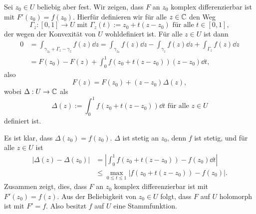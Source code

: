 \documentclass[a4paper,10pt]{article}
\begin{document}
Sei $z_0 \in U$ beliebig aber fest. Wir zeigen, dass $F$ an $z_0$ komplex differenzierbar ist mit $F'(z_0) = f(z_0)$. Hierfür definieren wir für alle $z \in \mathbb{C}$ den Weg
\[
 \Gamma_z : [0,1] \to U \text{ mit } \Gamma_z(t) := z_0 + t(z-z_0) \text{ für alle } t \in [0,1],
\]
der wegen der Konvexität von $U$ wohldefiniert ist. Für alle $z \in U$ ist dann
\begin{align*}
 0
 &= \int_{\gamma_{z_0} + \Gamma_z - \gamma_z} f(z) \dd{z}
 = \int_{\gamma_{z_0}} f(z) \dd{z} - \int_{\gamma_z} f(z) \dd{z} + \int_{\Gamma_z} f(z) \dd{z} \\
 &= F(z_0) - F(z) + \int_0^1 f(z_0 + t(z-z_0))(z-z_0) \dd{t},
\end{align*}
also
\[
 F(z) = F(z_0) + (z-z_0) \Delta(z),
\]
wobei $\Delta : U \to \mathbb{C}$ als
\[
 \Delta(z) := \int_0^1 f(z_0 + t(z-z_0)) \dd{t} \text{ für alle } z \in U
\]
definiert ist.

Es ist klar, dass $\Delta(z_0) = f(z_0)$. $\Delta$ ist stetig an $z_0$, denn $f$ ist stetig, und für alle $z \in U$ ist
\begin{align*}
 |\Delta(z)-\Delta(z_0)|
 &= \left| \int_0^1 f(z_0+t(z-z_0)) - f(z_0) \dd{t} \right| \\
 &\leq \max_{0 \leq t \leq 1} |f(z_0+t(z-z_0))-f(z_0)|.
\end{align*}
Zusammen zeigt, dies, dass $F$ an $z_0$ komplex differenzierbar ist mit $F'(z_0) = f(z)$. Aus der Beliebigkeit von $z_0 \in U$ folgt, dass $F$ auf $U$ holomorph ist mit $F' = f$. Also besitzt $f$ auf $U$ eine Stammfunktion.
\end{document}

